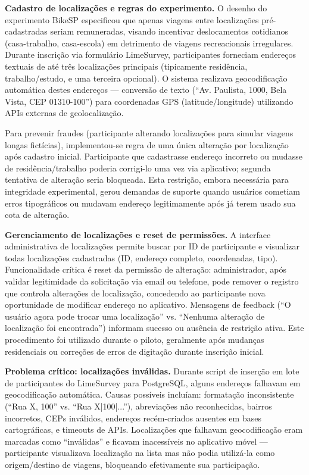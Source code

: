 

\textbf{Cadastro de localizações e regras do experimento.} O desenho do experimento BikeSP especificou que apenas viagens entre localizações pré-cadastradas seriam remuneradas, visando incentivar deslocamentos cotidianos (casa-trabalho, casa-escola) em detrimento de viagens recreacionais irregulares. Durante inscrição via formulário LimeSurvey, participantes forneciam endereços textuais de até três localizações principais (tipicamente residência, trabalho/estudo, e uma terceira opcional). O sistema realizava geocodificação automática destes endereços  --- conversão de texto (``Av. Paulista, 1000, Bela Vista, CEP 01310-100'') para coordenadas GPS (latitude/longitude) utilizando APIs externas de geolocalização.

Para prevenir fraudes (participante alterando localizações para simular viagens longas fictícias), implementou-se regra de uma única alteração por localização após cadastro inicial. Participante que cadastrasse endereço incorreto ou mudasse de residência/trabalho poderia corrigi-lo uma vez via aplicativo; segunda tentativa de alteração seria bloqueada. Esta restrição, embora necessária para integridade experimental, gerou demandas de suporte quando usuários cometiam erros tipográficos ou mudavam endereço legitimamente após já terem usado sua cota de alteração.

\textbf{Gerenciamento de localizações e reset de permissões.} A interface administrativa de localizações permite buscar por ID de participante e visualizar todas localizações cadastradas (ID, endereço completo, coordenadas, tipo). Funcionalidade crítica é reset da permissão de alteração: administrador, após validar legitimidade da solicitação via email ou telefone, pode remover o registro que controla alterações de localização, concedendo ao participante nova oportunidade de modificar endereço no aplicativo. Mensagens de feedback (``O usuário agora pode trocar uma localização'' vs. ``Nenhuma alteração de localização foi encontrada'') informam sucesso ou ausência de restrição ativa. Este procedimento foi utilizado durante o piloto, geralmente após mudanças residenciais ou correções de erros de digitação durante inscrição inicial.

\textbf{Problema crítico: localizações inválidas.} Durante script de inserção em lote de participantes do LimeSurvey para PostgreSQL, alguns endereços falhavam em geocodificação automática. Causas possíveis incluíam: formatação inconsistente (``Rua X, 100'' vs. ``Rua X|100|...''), abreviações não reconhecidas, bairros incorretos, CEPs inválidos, endereços recém-criados ausentes em bases cartográficas, e timeouts de APIs. Localizações que falhavam geocodificação eram marcadas como ``inválidas'' e ficavam inacessíveis no aplicativo móvel ---  participante visualizava localização na lista mas não podia utilizá-la como origem/destino de viagens, bloqueando efetivamente sua participação.

